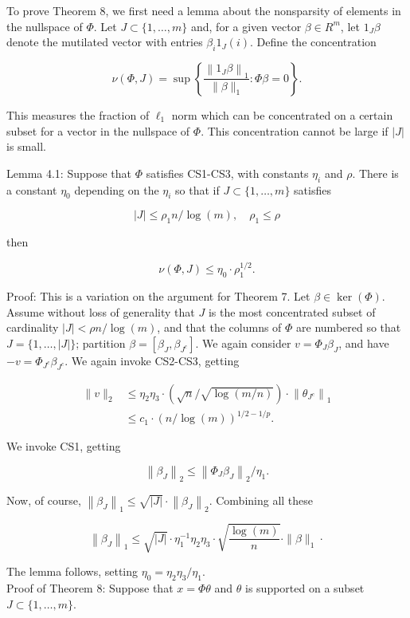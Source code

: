 \documentclass[10pt]{article}
\begin{document}
To prove Theorem 8, we first need a lemma about the nonsparsity of elements in the nullspace of $\Phi$. Let $J \subset\{1, \ldots, m\}$ and, for a given vector $\beta \in R^{m}$, let $1_{J} \beta$ denote the mutilated vector with entries $\beta_{i} 1_{J}(i)$. Define the concentration

$$
\nu(\Phi, J)=\sup \left\{\frac{\left\|1_{J} \beta\right\|_{1}}{\|\beta\|_{1}}: \Phi \beta=0\right\} .
$$

This measures the fraction of $\ell_{1}$ norm which can be concentrated on a certain subset for a vector in the nullspace of $\Phi$. This concentration cannot be large if $|J|$ is small.

Lemma 4.1: Suppose that $\Phi$ satisfies CS1-CS3, with constants $\eta_{i}$ and $\rho$. There is a constant $\eta_{0}$ depending on the $\eta_{i}$ so that if $J \subset\{1, \ldots, m\}$ satisfies

$$
|J| \leq \rho_{1} n / \log (m), \quad \rho_{1} \leq \rho
$$

then

$$
\nu(\Phi, J) \leq \eta_{0} \cdot \rho_{1}^{1 / 2} .
$$

Proof: This is a variation on the argument for Theorem 7. Let $\beta \in \operatorname{ker}(\Phi)$. Assume without loss of generality that $J$ is the most concentrated subset of cardinality $|J|<\rho n / \log (m)$, and that the columns of $\Phi$ are numbered so that $J=\{1, \ldots,|J|\}$; partition $\beta=\left[\beta_{J}, \beta_{J^{c}}\right]$. We again consider $v=\Phi_{J} \beta_{J}$, and have $-v=\Phi_{J^{c}} \beta_{J^{c}}$. We again invoke CS2-CS3, getting

$$
\begin{aligned}
\|v\|_{2} & \leq \eta_{2} \eta_{3} \cdot(\sqrt{n} / \sqrt{\log (m / n)}) \cdot\left\|\theta_{J^{c}}\right\|_{1} \\
& \leq c_{1} \cdot(n / \log (m))^{1 / 2-1 / p} .
\end{aligned}
$$

We invoke CS1, getting

$$
\left\|\beta_{J}\right\|_{2} \leq\left\|\Phi_{J} \beta_{J}\right\|_{2} / \eta_{1} .
$$

Now, of course, $\left\|\beta_{J}\right\|_{1} \leq \sqrt{|J|} \cdot\left\|\beta_{J}\right\|_{2}$. Combining all these

$$
\left\|\beta_{J}\right\|_{1} \leq \sqrt{|J|} \cdot \eta_{1}^{-1} \eta_{2} \eta_{3} \cdot \sqrt{\frac{\log (m)}{n}} \cdot\|\beta\|_{1} \cdot
$$

The lemma follows, setting $\eta_{0}=\eta_{2} \eta_{3} / \eta_{1}$.\\
Proof of Theorem 8: Suppose that $x=\Phi \theta$ and $\theta$ is supported on a subset $J \subset\{1, \ldots, m\}$.
\end{document}
